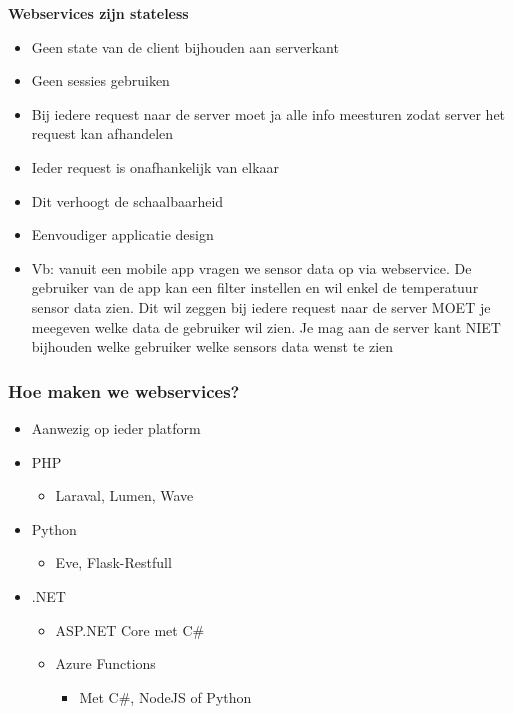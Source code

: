 \documentclass{article}
\newcommand{\bold}[1]{\textbf{#1}}
\begin{document}
\bold{Webservices zijn stateless}

\begin{itemize}
    \item Geen state van de client bijhouden aan serverkant
    \item Geen sessies gebruiken
    \item Bij iedere request naar de server moet ja alle info meesturen zodat server het request kan afhandelen
    \item Ieder request is onafhankelijk van elkaar
    \item Dit verhoogt de schaalbaarheid
    \item Eenvoudiger applicatie design
    \item Vb: vanuit een mobile app vragen we sensor data op via webservice. 
    De gebruiker van de app kan een filter instellen en wil enkel de temperatuur sensor data zien. 
    Dit wil zeggen bij iedere request naar de server MOET je meegeven welke data de gebruiker wil zien. 
    Je mag aan de server kant NIET bijhouden welke gebruiker welke sensors data wenst te zien
\end{itemize}

\subsubsection{Hoe maken we webservices?}

\begin{itemize}
    \item Aanwezig op ieder platform
    \item PHP
    \begin{itemize}
        \item Laraval, Lumen, Wave
    \end{itemize}
    \item Python
    \begin{itemize}
        \item Eve, Flask-Restfull
    \end{itemize}
    \item .NET
    \begin{itemize}
        \item ASP.NET Core met C\#
        \item Azure Functions
        \begin{itemize}
            \item Met C\#, NodeJS of Python
        \end{itemize}
    \end{itemize}
\end{itemize}
\end{document}
